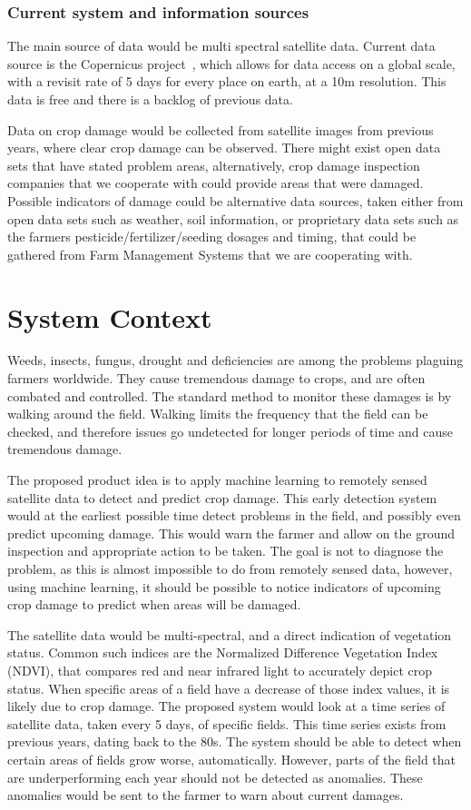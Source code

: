 \documentclass[a4paper]{article}
\begin{document}
\subsubsection{Current system and information sources}
The main source of data would be multi spectral satellite data. Current data source is the
Copernicus project~\cite{copernicus}, which allows for data access on a global scale, with a revisit rate of 5 days for every place on earth, at a 10m resolution. This data is free and there is a backlog of
previous data.

Data on crop damage would be collected from satellite images from previous years, where
clear crop damage can be observed. There might exist open data sets that have stated problem
areas, alternatively, crop damage inspection companies that we cooperate with could provide
areas that were damaged. Possible indicators of damage could be alternative data sources,
taken either from open data sets such as weather, soil information, or proprietary data sets
such as the farmers pesticide/fertilizer/seeding dosages and timing, that could be gathered from
Farm Management Systems that we are cooperating with.

\section{System Context}
Weeds, insects, fungus, drought and deficiencies are among the problems plaguing farmers
worldwide. They cause tremendous damage to crops, and are often combated and controlled.
The standard method to monitor these damages is by walking around the field. Walking limits
the frequency that the field can be checked, and therefore issues go undetected for longer
periods of time and cause tremendous damage.

The proposed product idea is to apply machine learning to remotely sensed satellite data to
detect and predict crop damage. This early detection system would at the earliest possible time
detect problems in the field, and possibly even predict upcoming damage. This would warn the
farmer and allow on the ground inspection and appropriate action to be taken. The goal is not to
diagnose the problem, as this is almost impossible to do from remotely sensed data, however,
using machine learning, it should be possible to notice indicators of upcoming crop damage to
predict when areas will be damaged.

The satellite data would be multi-spectral, and a direct indication of vegetation status. Common
such indices are the Normalized Difference Vegetation Index (NDVI), that compares red and
near infrared light to accurately depict crop status. When specific areas of a field have a
decrease of those index values, it is likely due to crop damage. The proposed system would
look at a time series of satellite data, taken every 5 days, of specific fields. This time series
exists from previous years, dating back to the 80s. The system should be able to detect when
certain areas of fields grow worse, automatically. However, parts of the field that are
underperforming each year should not be detected as anomalies. These anomalies would be
sent to the farmer to warn about current damages.
\end{document}
